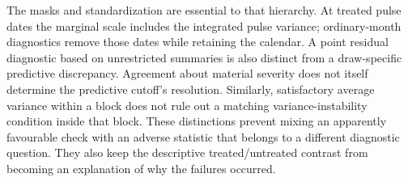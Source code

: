 \documentclass[11pt,a4paper]{article}
\begin{document}
The masks and standardization are essential to that hierarchy. At treated pulse dates the marginal scale includes the integrated pulse variance; ordinary-month diagnostics remove those dates while retaining the calendar. A point residual diagnostic based on unrestricted summaries is also distinct from a draw-specific predictive discrepancy. Agreement about material severity does not itself determine the predictive cutoff's resolution. Similarly, satisfactory average variance within a block does not rule out a matching variance-instability condition inside that block. These distinctions prevent mixing an apparently favourable check with an adverse statistic that belongs to a different diagnostic question. They also keep the descriptive treated/untreated contrast from becoming an explanation of why the failures occurred.
\end{document}
